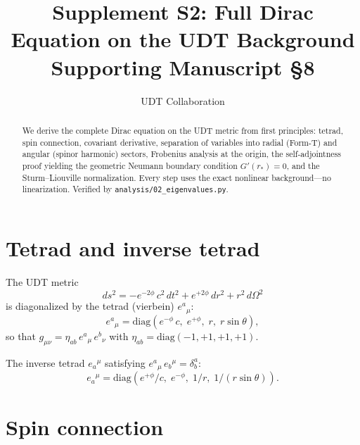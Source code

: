 \documentclass[11pt,letterpaper]{article}
\title{Supplement S2: Full Dirac Equation on the UDT Background \\
\large Supporting Manuscript \S8}
\author{UDT Collaboration}
\date{}
\numberwithin{equation}{section}
\begin{document}
\maketitle

\begin{abstract}
We derive the complete Dirac equation on the UDT metric from first
principles: tetrad, spin connection, covariant derivative, separation of
variables into radial (Form-T) and angular (spinor harmonic) sectors,
Frobenius analysis at the origin, the self-adjointness proof yielding the
geometric Neumann boundary condition $G'(r_*) = 0$, and the
Sturm--Liouville normalization. Every step uses the exact nonlinear
background---no linearization. Verified by
\texttt{analysis/02\_eigenvalues.py}.
\end{abstract}

\tableofcontents

\section{Tetrad and inverse tetrad}
\label{sec:tetrad}

The UDT metric
\begin{equation}
\label{eq:metric}
  ds^2 = -e^{-2\phi}\,c^2\,dt^2 + e^{+2\phi}\,dr^2 + r^2\,d\Omega^2
\end{equation}
is diagonalized by the tetrad (vierbein) $e^a{}_\mu$:
\begin{equation}
\label{eq:tetrad}
\boxed{
  e^a{}_\mu = \mathrm{diag}\!\left(e^{-\phi}\,c,\; e^{+\phi},\; r,\; r\sin\theta\right),
}
\end{equation}
so that $g_{\mu\nu} = \eta_{ab}\,e^a{}_\mu\,e^b{}_\nu$ with
$\eta_{ab} = \mathrm{diag}(-1,+1,+1,+1)$.

The inverse tetrad $e_a{}^\mu$ satisfying $e^a{}_\mu\,e_b{}^\mu = \delta^a_b$:
\begin{equation}
\label{eq:inv_tetrad}
  e_a{}^\mu = \mathrm{diag}\!\left(e^{+\phi}/c,\; e^{-\phi},\; 1/r,\; 1/(r\sin\theta)\right).
\end{equation}

\section{Spin connection}
\label{sec:spin_connection}
\end{document}
